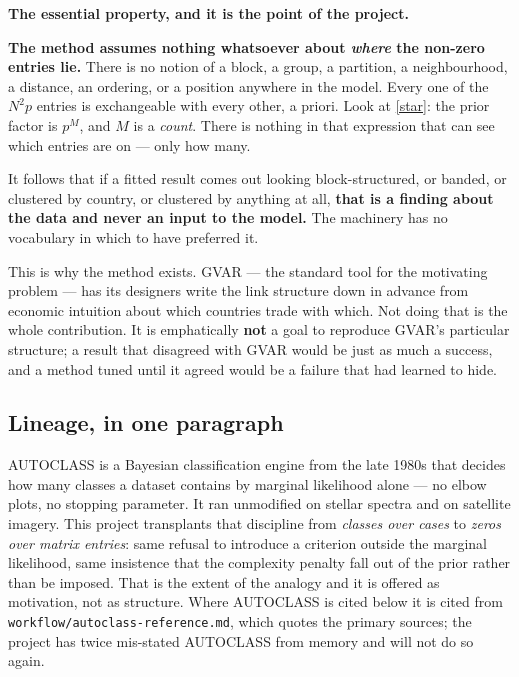 \begin{recordbox}
\textbf{The essential property, and it is the point of the project.}

\textbf{The method assumes nothing whatsoever about \emph{where} the non-zero entries
lie.} There is no notion of a block, a group, a partition, a neighbourhood, a
distance, an ordering, or a position anywhere in the model. Every one of the $N^2p$
entries is exchangeable with every other, a priori. Look at \eqref{star}: the prior
factor is $p^M$, and $M$ is a \emph{count}. There is nothing in that expression that
can see which entries are on --- only how many.

It follows that if a fitted result comes out looking block-structured, or banded, or
clustered by country, or clustered by anything at all, \textbf{that is a finding
about the data and never an input to the model.} The machinery has no vocabulary in
which to have preferred it.

This is why the method exists. GVAR --- the standard tool for the motivating problem
--- has its designers write the link structure down in advance from economic
intuition about which countries trade with which. Not doing that is the whole
contribution. It is emphatically \textbf{not} a goal to reproduce GVAR's particular
structure; a result that disagreed with GVAR would be just as much a success, and a
method tuned until it agreed would be a failure that had learned to hide.
\end{recordbox}

\subsection*{Lineage, in one paragraph}

AUTOCLASS is a Bayesian classification engine from the late 1980s that decides how
many classes a dataset contains by marginal likelihood alone --- no elbow plots, no
stopping parameter. It ran unmodified on stellar spectra and on satellite imagery.
This project transplants that discipline from \emph{classes over cases} to
\emph{zeros over matrix entries}: same refusal to introduce a criterion outside the
marginal likelihood, same insistence that the complexity penalty fall out of the
prior rather than be imposed. That is the extent of the analogy and it is offered as
motivation, not as structure. Where AUTOCLASS is cited below it is cited from
\texttt{workflow/autoclass-reference.md}, which quotes the primary sources; the
project has twice mis-stated AUTOCLASS from memory and will not do so again.

